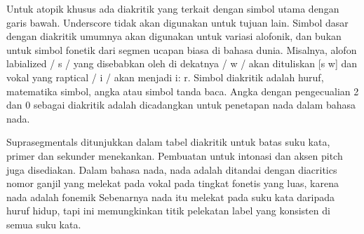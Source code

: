 	Untuk atopik khusus ada diakritik yang terkait dengan simbol utama dengan garis bawah.
	Underscore tidak akan digunakan untuk tujuan lain. Simbol dasar dengan diakritik umumnya akan digunakan untuk variasi alofonik, dan bukan untuk simbol fonetik dari segmen ucapan biasa di bahasa dunia. Misalnya, alofon labialized / s / yang disebabkan oleh di dekatnya / w / akan dituliskan [s w] dan vokal yang raptical / i / akan menjadi i: r. Simbol diakritik adalah huruf, matematika simbol, angka atau simbol tanda baca. Angka dengan pengecualian 2 dan 0 sebagai diakritik adalah dicadangkan untuk penetapan nada dalam bahasa nada.

	Suprasegmentals ditunjukkan dalam tabel diakritik untuk batas suku kata, primer dan sekunder
    menekankan. Pembuatan untuk intonasi dan aksen pitch juga disediakan. Dalam bahasa nada, nada adalah
    ditandai dengan diacritics nomor ganjil yang melekat pada vokal pada tingkat fonetis yang luas, karena nada
    adalah fonemik Sebenarnya nada itu melekat pada suku kata daripada huruf hidup, tapi ini
    memungkinkan titik pelekatan label yang konsisten di semua suku kata.



